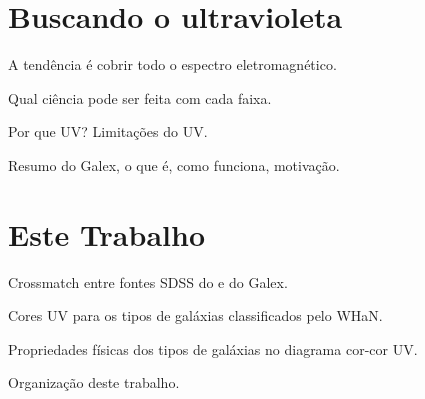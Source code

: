 
\section{Buscando o ultravioleta}
\label{sec:Intro:UV}

A tendência é cobrir todo o espectro eletromagnético.

Qual ciência pode ser feita com cada faixa.

Por que UV? Limitações do UV.

Resumo do Galex, o que é, como funciona, motivação.



\section{Este Trabalho}
\label{sec:Intro:EsteTrab}

Crossmatch entre fontes SDSS do \starlight{} e do Galex.

Cores UV para os tipos de galáxias classificados pelo WHaN.

Propriedades físicas dos tipos de galáxias no diagrama cor-cor UV.

Organização deste trabalho.

